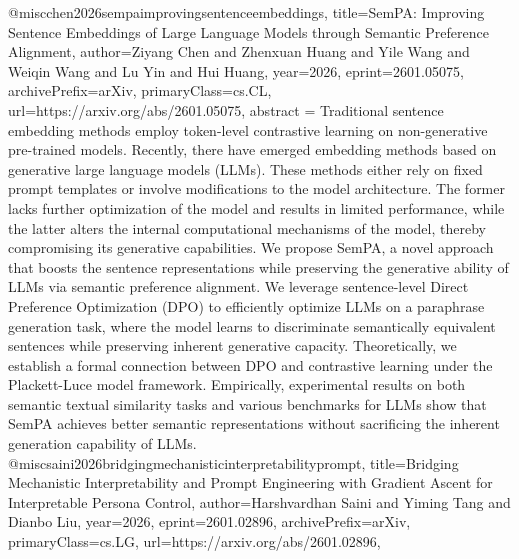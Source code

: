 {}@misc{chen2026sempaimprovingsentenceembeddings,
      title={SemPA: Improving Sentence Embeddings of Large Language Models through Semantic Preference Alignment}, 
      author={Ziyang Chen and Zhenxuan Huang and Yile Wang and Weiqin Wang and Lu Yin and Hui Huang},
      year={2026},
      eprint={2601.05075},
      archivePrefix={arXiv},
      primaryClass={cs.CL},
      url={https://arxiv.org/abs/2601.05075},
      abstract = {Traditional sentence embedding methods employ token-level contrastive learning on non-generative pre-trained models. Recently, there have emerged embedding methods based on generative large language models (LLMs). These methods either rely on fixed prompt templates or involve modifications to the model architecture. The former lacks further optimization of the model and results in limited performance, while the latter alters the internal computational mechanisms of the model, thereby compromising its generative capabilities. We propose SemPA, a novel approach that boosts the sentence representations while preserving the generative ability of LLMs via semantic preference alignment. We leverage sentence-level Direct Preference Optimization (DPO) to efficiently optimize LLMs on a paraphrase generation task, where the model learns to discriminate semantically equivalent sentences while preserving inherent generative capacity. Theoretically, we establish a formal connection between DPO and contrastive learning under the Plackett-Luce model framework. Empirically, experimental results on both semantic textual similarity tasks and various benchmarks for LLMs show that SemPA achieves better semantic representations without sacrificing the inherent generation capability of LLMs.}
}@misc{saini2026bridgingmechanisticinterpretabilityprompt,
      title={Bridging Mechanistic Interpretability and Prompt Engineering with Gradient Ascent for Interpretable Persona Control}, 
      author={Harshvardhan Saini and Yiming Tang and Dianbo Liu},
      year={2026},
      eprint={2601.02896},
      archivePrefix={arXiv},
      primaryClass={cs.LG},
      url={https://arxiv.org/abs/2601.02896},
}
